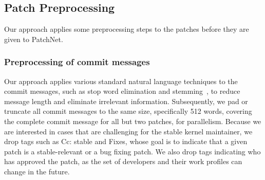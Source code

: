 

\subsection{Patch Preprocessing}
\label{sec:patch_processing}

Our approach applies some preprocessing steps to the patches before they are
given to PatchNet.

\subsubsection{Preprocessing of commit messages}

Our approach applies various standard natural language techniques to the
commit messages, such as stop word elimination and
stemming~\cite{vijayarani2015preprocessing, brants2003natural}, to reduce
message length and eliminate irrelevant information.  Subsequently, we pad
or truncate all commit messages to the same size, specifically 512 words,
covering the complete commit message for all but two patches, for
parallelism.  Because we are interested in cases that are challenging for
the stable kernel maintainer, we drop tags such as Cc: stable and Fixes,
whose goal is to indicate that a given patch is a stable-relevant or a bug
fixing patch.  We also drop tags indicating who has approved the patch, as
the set of developers and their work profiles can change in the future.

